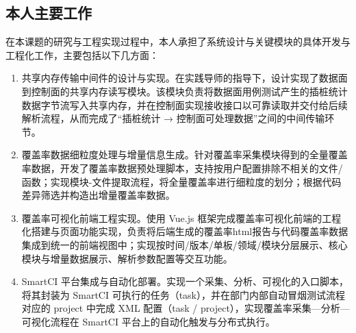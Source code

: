 \subsection{本人主要工作}
    在本课题的研究与工程实现过程中，本人承担了系统设计与关键模块的具体开发与工程化工作，主要包括以下几方面：
    \begin{enumerate}
        \item 共享内存传输中间件的设计与实现。在实践导师的指导下，设计实现了数据面到控制面的共享内存读写模块。该模块负责将数据面用例测试产生的插桩统计数据字节流写入共享内存，并在控制面实现接收接口以可靠读取并交付给后续解析流程，从而完成了“插桩统计 → 控制面可处理数据”之间的中间传输环节。
        \item 覆盖率数据细粒度处理与增量信息生成。针对覆盖率采集模块得到的全量覆盖率数据，开发了覆盖率数据预处理脚本，支持按用户配置排除不相关的文件/函数；实现模块-文件提取流程，将全量覆盖率进行细粒度的划分；根据代码差异筛选并构造出增量覆盖率数据。
        \item 覆盖率可视化前端工程实现。使用 Vue.js 框架完成覆盖率可视化前端的工程化搭建与页面功能实现，负责将后端生成的覆盖率html报告与代码覆盖率数据集成到统一的前端视图中；实现按时间/版本/单板/领域/模块分层展示、核心模块与增量数据展示、解析参数配置等交互功能。
        \item SmartCI 平台集成与自动化部署。实现一个采集、分析、可视化的入口脚本，将其封装为 SmartCI 可执行的任务（task），并在部门内部自动冒烟测试流程对应的 project 中完成 XML 配置（task / project），实现覆盖率采集—分析—可视化流程在 SmartCI 平台上的自动化触发与分布式执行。
    \end{enumerate}

